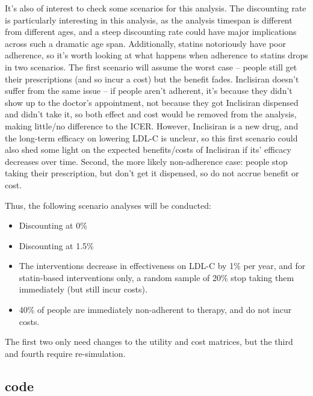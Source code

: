 \documentclass[11pt]{article}
\begin{document}
It's also of interest to check some scenarios for this analysis. 
The discounting rate is particularly interesting in this analysis, 
as the analysis timespan is different from different ages, and a
steep discounting rate could have major implications across 
such a dramatic age span. Additionally, statins notoriously have poor
adherence, so it's worth looking at what happens when adherence to statins
drops in two scenarios. The first scenario will assume the worst case -- people still get their
prescriptions (and so incur a cost) but the benefit fades. Inclisiran
doesn't suffer from the same issue -- if people aren't adherent, 
it's because they didn't show up to the doctor's appointment, not because they
got Inclisiran dispensed and didn't take it, so both effect and cost would be
removed from the analysis, making little/no difference to the ICER. 
However, Inclisiran is a new drug, and the long-term efficacy on lowering LDL-C
is unclear, so this first scenario could also shed some light on the expected benefits/costs
of Inclisiran if its' efficacy decreases over time. Second, the more likely
non-adherence case: people stop taking their prescription, but don't get it dispensed, 
so do not accrue benefit or cost. 

Thus, the following scenario analyses will be conducted:

\begin{itemize}
\item Discounting at 0\%
\item Discounting at 1.5\%
\item The interventions decrease in effectiveness on LDL-C by 1\% per year, 
and for statin-based interventions only,
a random sample of 20\% stop taking them immediately (but still incur costs). 
\item 40\% of people are immediately non-adherent to therapy, and do not incur costs. 
\end{itemize}

The first two only need changes to the utility and cost matrices, 
but the third and fourth require re-simulation.

\subsection{code}

\color{Blue4}
\begin{stlog}\end{stlog}
\color{black}

\clearpage
\end{document}
